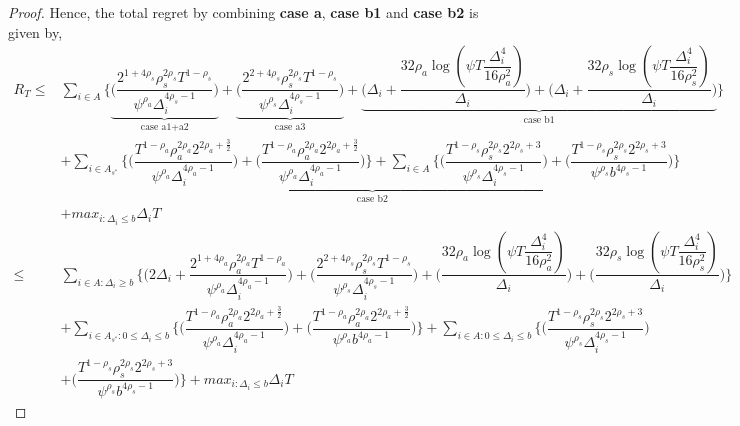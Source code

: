\begin{proof}
Hence, the total regret by combining \textbf{case a}, \textbf{case b1} and \textbf{case b2} is given by,
 \begin{align*}
 R_{T}\leq & \sum_{i\in A} \bigg\lbrace  \underbrace{\bigg(\dfrac{2^{1+4\rho_{s}}\rho_{s}^{2\rho_{s}}T^{1-\rho_{s}}}{\psi^{\rho_{a}}\Delta_{i}^{4\rho_{s}-1}}\bigg)}_{\text{case a1+a2}} + \underbrace{  \bigg(\dfrac{2^{2+4\rho_{s}}\rho_{s}^{2\rho_{s}}T^{1-\rho_{s}}}{\psi^{\rho_{s}}\Delta_{i}^{4\rho_{s}-1}}\bigg)}_{\text{case a3}} + \underbrace{\bigg(\Delta_{i}+\dfrac{32\rho_{a}\log{(\psi T\dfrac{\Delta_{i}^{4}}{16\rho_{a}^{2}})}}{\Delta_{i}}\bigg) + \bigg(\Delta_{i}+\dfrac{32\rho_{s}\log{(\psi T\dfrac{\Delta_{i}^{4}}{16\rho_{s}^{2}})}}{\Delta_{i}}\bigg)}_{\text{case b1}}\bigg\rbrace \\
 & + \underbrace{\sum_{i\in A_{s^{*}}}\bigg\lbrace \bigg(\dfrac{T^{1-\rho_{a}}\rho_{a}^{2\rho_{a}}2^{2\rho_{a}+\frac{3}{2}}}{\psi^{\rho_{a}}\Delta_{i}^{4\rho_{a} -1}} \bigg) + \bigg(\dfrac{T^{1-\rho_{a}}\rho_{a}^{2\rho_{a}}2^{2\rho_{a}+\frac{3}{2}}}{\psi^{\rho_{a}}\Delta_{i}^{4\rho_{a} -1}} \bigg)\bigg\rbrace + \sum_{i\in A}\bigg\lbrace \bigg(\dfrac{T^{1-\rho_{s}}\rho_{s}^{2\rho_{s}}2^{2\rho_{s}+3}}{\psi^{\rho_{
s}}\Delta_{i}^{4\rho_{s}-1}} \bigg)+\bigg(\dfrac{T^{1-\rho_{s}}\rho_{s}^{2\rho_{s}}2^{2\rho_{s}+3}}{\psi^{\rho_{s}}b^{4\rho_{s} -1}} \bigg)}_{\text{case b2}} \bigg\rbrace \\ 
 & + max_{i:\Delta_{i}\leq b}\Delta_{i}T \\
 \leq & \sum\limits_{i\in A:\Delta_{i}\geq b} \bigg\lbrace \bigg(2\Delta_{i}+\dfrac{2^{1+4\rho_{a}}\rho_{a}^{2\rho_{a}}T^{1-\rho_{a}}}{\psi^{\rho_{a}}\Delta_{i}^{4\rho_{a}-1}}\bigg) + \bigg(\dfrac{2^{2+4\rho_{s}}\rho_{s}^{2\rho_{s}}T^{1-\rho_{s}}}{\psi^{\rho_{s}}\Delta_{i}^{4\rho_{s}-1}}\bigg)  + \bigg(\dfrac{32\rho_{a}\log{(\psi T\dfrac{\Delta_{i}^{4}}{16\rho_{a}^{2}})}}{\Delta_{i}}\bigg) + \bigg(\dfrac{32\rho_{s}\log{(\psi T\dfrac{\Delta_{i}^{4}}{16\rho_{s}^{2}})}}{\Delta_{i}}\bigg)\bigg\rbrace \\
 & + \sum\limits_{i\in A_{s^{*}}:0\leq\Delta_{i}\leq b}\bigg\lbrace \bigg(\dfrac{T^{1-\rho_{a}}\rho_{a}^{2\rho_{a}}2^{2\rho_{a}+\frac{3}{2}}}{\psi^{\rho_{a}}\Delta_{i}^{4\rho_{a}-1}} \bigg)+\bigg(\dfrac{T^{1-\rho_{a}}\rho_{a}^{2\rho_{a}}2^{2\rho_{a}+\frac{3}{2}}}{\psi^{\rho_{a}}b^{4\rho_{a} -1}} \bigg)\bigg\rbrace + \sum\limits_{i\in A:0\leq\Delta_{i}\leq b}\bigg\lbrace  \bigg(\dfrac{T^{1-\rho_{s}}\rho_{s}^{2\rho_{s}}2^{2\rho_{s}+3}}{\psi^{\rho_{s}}\Delta_{i}^{4\rho_{s}-1}} \bigg) \\ 
 & +\bigg(\dfrac{T^{1-\rho_{s}}\rho_{s}^{2\rho_{s}}2^{2\rho_{s}+3}}{\psi^{\rho_{s}}b^{4\rho_{s} -1}} \bigg) \bigg\rbrace + max_{i:\Delta_{i}\leq b}\Delta_{i}T
 \end{align*}

\end{proof}

